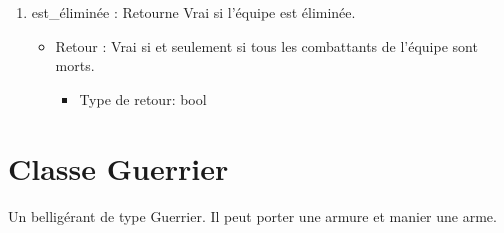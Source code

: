 \documentclass[12pt,pdftex,oneside]{article}
\begin{document}
\begin{itemize}
\begin{enumerate}
    \item est\_éliminée : Retourne Vrai si l'équipe est éliminée.
      \begin{itemize}
      \item Retour : Vrai si et seulement si tous les combattants de l'équipe
        sont morts.
          \begin{itemize}
          \item Type de retour: bool
          \end{itemize}
      \end{itemize}

    \end{enumerate}
  \end{itemize}

  \section {Classe Guerrier}

  Un belligérant de type Guerrier. Il peut porter une armure et manier une arme.
\end{document}
